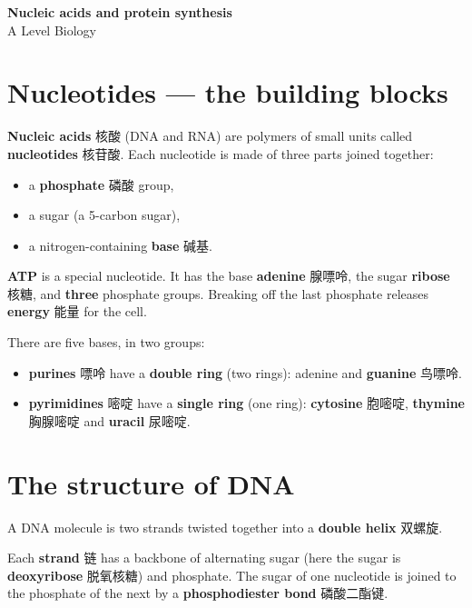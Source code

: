 \documentclass[11pt]{article}
\begin{document}
\begin{center}
  {\LARGE\bfseries Nucleic acids and protein synthesis}\\[0.35em]
  {\large A Level Biology}
\end{center}
\vspace{0.6em}

\section*{Nucleotides — the building blocks}

\textbf{Nucleic acids} 核酸 (DNA and RNA) are polymers of small units called \textbf{nucleotides} 核苷酸. Each nucleotide is made of three parts joined together:

\begin{itemize}
\item a \textbf{phosphate} 磷酸 group,

\item a sugar (a 5-carbon sugar),

\item a nitrogen-containing \textbf{base} 碱基.

\end{itemize}

\textbf{ATP} is a special nucleotide. It has the base \textbf{adenine} 腺嘌呤, the sugar \textbf{ribose} 核糖, and \textbf{three} phosphate groups. Breaking off the last phosphate releases \textbf{energy} 能量 for the cell.

There are five bases, in two groups:

\begin{itemize}
\item \textbf{purines} 嘌呤 have a \textbf{double ring} (two rings): adenine and \textbf{guanine} 鸟嘌呤.

\item \textbf{pyrimidines} 嘧啶 have a \textbf{single ring} (one ring): \textbf{cytosine} 胞嘧啶, \textbf{thymine} 胸腺嘧啶 and \textbf{uracil} 尿嘧啶.

\end{itemize}

\section*{The structure of DNA}

A DNA molecule is two strands twisted together into a \textbf{double helix} 双螺旋.

Each \textbf{strand} 链 has a backbone of alternating sugar (here the sugar is \textbf{deoxyribose} 脱氧核糖) and phosphate. The sugar of one nucleotide is joined to the phosphate of the next by a \textbf{phosphodiester bond} 磷酸二酯键.
\end{document}
